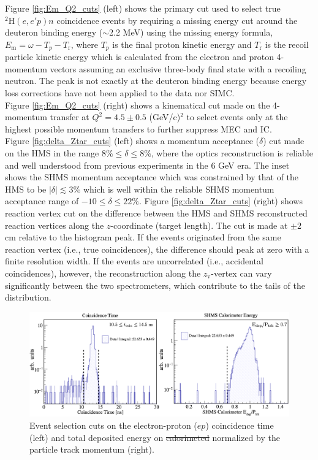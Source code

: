 \documentclass[aps, prl]{revtex4-2}  %
\providecommand{\DIFaddtex}[1]{{\protect\color{blue}\uwave{#1}}} %
\providecommand{\DIFdeltex}[1]{{\protect\color{red}\sout{#1}}}                      %
\providecommand{\DIFaddFL}[1]{\DIFadd{#1}} %
\providecommand{\DIFdelFL}[1]{\DIFdel{#1}} %
\providecommand{\DIFaddbeginFL}{} %
\providecommand{\DIFaddendFL}{} %
\providecommand{\DIFdelbeginFL}{} %
\providecommand{\DIFdelendFL}{} %
\providecommand{\DIFadd}[1]{\texorpdfstring{\DIFaddtex{#1}}{#1}} %
\providecommand{\DIFdel}[1]{\texorpdfstring{\DIFdeltex{#1}}{}} %
\newcommand{\DIFscaledelfig}{0.5}
\newlength{\DIFdelgraphicswidth} %
\newlength{\DIFdelgraphicsheight} %
\newcommand{\DIFaddincludegraphics}[2][]{{\color{blue}\fbox{\DIFOincludegraphics[#1]{#2}}}} %
\newcommand{\DIFdelincludegraphics}[2][]{%
\sbox{\DIFdelgraphicsbox}{\DIFOincludegraphics[#1]{#2}}%
\settoboxwidth{\DIFdelgraphicswidth}{\DIFdelgraphicsbox} %
\settoboxtotalheight{\DIFdelgraphicsheight}{\DIFdelgraphicsbox} %
\scalebox{\DIFscaledelfig}{%
\parbox[b]{\DIFdelgraphicswidth}{\usebox{\DIFdelgraphicsbox}\\[-\baselineskip] \rule{\DIFdelgraphicswidth}{0em}}\llap{\resizebox{\DIFdelgraphicswidth}{\DIFdelgraphicsheight}{%
\setlength{\unitlength}{\DIFdelgraphicswidth}%
\begin{picture}(1,1)%
\thicklines\linethickness{2pt} %
{\color[rgb]{1,0,0}\put(0,0){\framebox(1,1){}}}%
{\color[rgb]{1,0,0}\put(0,0){\line( 1,1){1}}}%
{\color[rgb]{1,0,0}\put(0,1){\line(1,-1){1}}}%
\end{picture}%
}\hspace*{3pt}}} %
} %
\DeclareRobustCommand{\DIFaddbeginFL}{\DIFOaddbeginFL \let\includegraphics\DIFaddincludegraphics} %
\DeclareRobustCommand{\DIFaddendFL}{\DIFOaddendFL \let\includegraphics\DIFOincludegraphics} %
\DeclareRobustCommand{\DIFdelbeginFL}{\DIFOdelbeginFL \let\includegraphics\DIFdelincludegraphics} %
\DeclareRobustCommand{\DIFdelendFL}{\DIFOaddendFL \let\includegraphics\DIFOincludegraphics} %
\begin{document}
\indent Figure \ref{fig:Em_Q2_cuts} (left) shows the primary cut used to select true $^{2}\mathrm{H}(e,e'p)n$ coincidence events by requiring a missing
energy cut around the deuteron binding energy ($\sim$2.2 MeV) using the missing energy formula, $E_{\mathrm{m}} = \omega - T_{p} - T_{\mathrm{r}}$, where
$T_{p}$ is the final proton kinetic energy and $T_{\mathrm{r}}$ is the recoil particle kinetic energy which is calculated from the electron and proton
4-momentum vectors assuming an exclusive three-body final state with a recoiling neutron. The peak is not exactly at the deuteron binding energy because
energy loss corrections have not been applied to the data nor SIMC. \\
\indent Figure \ref{fig:Em_Q2_cuts} (right) shows a
kinematical cut made on the 4-momentum transfer at $Q^{2} = 4.5\pm0.5$ (GeV/c)$^{2}$
to select events only at the highest possible momentum transfers to further suppress MEC and IC. \\
\indent Figure \ref{fig:delta_Ztar_cuts} (left) shows a momentum acceptance ($\delta$) cut made on the HMS in the range $8\%\leq\delta\leq8\%$, where the optics reconstruction
is reliable and well understood from previous experiments in the 6 GeV era. The inset shows the SHMS momentum acceptance which was constrained by that of the HMS to be
$|\delta|\lesssim$3$\%$ which is well within the reliable SHMS momentum acceptance range of $-10 \leq \delta \leq22 \%$. Figure \ref{fig:delta_Ztar_cuts} (right) shows reaction vertex cut
on the difference between the HMS and SHMS reconstructed reaction vertices along the $z$-coordinate (target length). The cut is made at $\pm2$ cm relative to the histogram peak.
If the events originated from the same reaction vertex (i.e., true coincidences), the difference should peak at zero with a finite resolution width. If the events are uncorrelated
(i.e., accidental coincidences), however, the reconstruction along the $z_{\mathrm{v}}$-vertex can vary significantly between the two spectrometers, which contribute to the tails of the
distribution.\\
\begin{figure}[!h]
\DIFdelbeginFL %
\DIFdelendFL \DIFaddbeginFL \includegraphics[scale=0.33]{plots/coin_and_eCal_CUT_80MeV_35deg.png}
\DIFaddendFL \caption{Event selection cuts on the electron-proton ($ep$) coincidence time (left) and total deposited energy on \DIFdelbeginFL \DIFdelFL{calorimeted }\DIFdelendFL \DIFaddbeginFL \DIFaddFL{calorimeter }\DIFaddendFL normalized by the particle track momentum (right).}
\label{fig:coin_ecal_cuts}
\end{figure}\\
\end{document}
